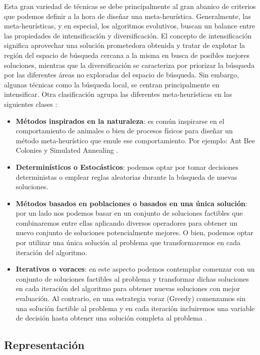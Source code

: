 Esta gran variedad de técnicas se debe principalmente al gran abanico de criterios que podemos definir a la hora de diseñar una meta-heurística. Generalmente, las meta-heurísticas, y en especial, los algoritmos evolutivos, buscan un balance entre las propiedades de intensificación y diversificación. El concepto de intensificación significa aprovechar una solución prometedora  obtenida y tratar de explotar la región del espacio de búsqueda cercana a la misma en busca de posibles mejores soluciones, mientras que la diversificación se caracteriza por priorizar la búsqueda por las diferentes áreas no exploradas del espacio de búsqueda. Sin embargo, algunas técnicas como la búsqueda local, se centran principalmente en intensificar. Otra clasificación agrupa las diferentes meta-heurísticas en las siguientes clases \cite{metabook}:

\begin{itemize}
    \item \textbf{Métodos inspirados en la naturaleza}: es común inspirarse en el comportamiento de animales o bien de procesos físicos para diseñar un método meta-heurístico que emule ese comportamiento. Por ejemplo: Ant Bee Colonies \cite{Mann2017} y Simulated Annealing \cite{SA}.
    \item \textbf{Determinísticos o Estocásticos}: podemos optar por tomar decisiones deterministas o emplear reglas aleatorias durante la búsqueda de nuevas soluciones.
    \item \textbf{Métodos basados en poblaciones o basados en una única solución}: por un lado nos podemos basar en un conjunto de soluciones factibles que combinaremos entre ellas aplicando diversos operadores para obtener un  nuevo conjunto de soluciones potencialmente mejores. O bien, podemos optar por utilizar una única solución al problema que transformaremos en cada iteración del algoritmo.
    \item \textbf{Iterativos o voraces}: en este aspecto podemos contemplar comenzar con un conjunto de soluciones factibles al problema y transformar dichas soluciones en cada iteración del algoritmo para obtener nuevas soluciones con mejor evaluación. Al contrario, en una estrategia voraz (Greedy) comenzamos sin una solución factible al problema y en cada iteración incluiremos una variable de decisión hasta obtener una solución completa al problema \cite{metabook}. 
\end{itemize}

\subsection{Representación}

